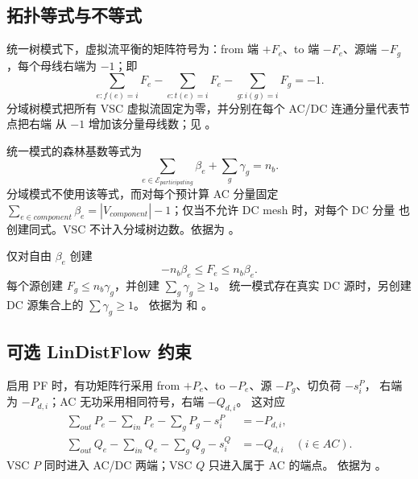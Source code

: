 \subsection{拓扑等式与不等式}

统一树模式下，虚拟流平衡的矩阵符号为：from 端 $+F_e$、to 端 $-F_e$、源端
$-F_g$，每个母线右端为 $-1$；即
\begin{equation}
 \sum_{e:f(e)=i}F_e-\sum_{e:t(e)=i}F_e-\sum_{g:i(g)=i}F_g=-1.
\end{equation}
分域树模式把所有 VSC 虚拟流固定为零，并分别在每个 AC/DC 连通分量代表节点把右端
从 $-1$ 增加该分量母线数；见 。

统一模式的森林基数等式为
\begin{equation}
 \sum_{e\in\mathcal E_{participating}}\beta_e+\sum_g\gamma_g=n_b.
\end{equation}
分域模式不使用该等式，而对每个预计算 AC 分量固定
$\sum_{e\in component}\beta_e=|V_{component}|-1$；仅当不允许 DC mesh 时，对每个 DC 分量
也创建同式。VSC 不计入分域树边数。依据为
。

仅对自由 $\beta_e$ 创建
\begin{equation}
 -n_b\beta_e\le F_e\le n_b\beta_e.
\end{equation}
每个源创建 $F_g\le n_b\gamma_g$，并创建 $\sum_g\gamma_g\ge1$。
统一模式存在真实 DC 源时，另创建 DC 源集合上的 $\sum\gamma_g\ge1$。
依据为  和
。

\subsection{可选 LinDistFlow 约束}

启用 PF 时，有功矩阵行采用 from $+P_e$、to $-P_e$、源 $-P_g$、切负荷 $-s_i^P$，
右端为 $-P_{d,i}$；AC 无功采用相同符号，右端 $-Q_{d,i}$。
这对应
\begin{align}
 \sum_{out}P_e-\sum_{in}P_e-\sum_gP_g-s_i^P&=-P_{d,i},\\
 \sum_{out}Q_e-\sum_{in}Q_e-\sum_gQ_g-s_i^Q&=-Q_{d,i}\quad(i\in AC).
\end{align}
VSC $P$ 同时进入 AC/DC 两端；VSC $Q$ 只进入属于 AC 的端点。
依据为 。

